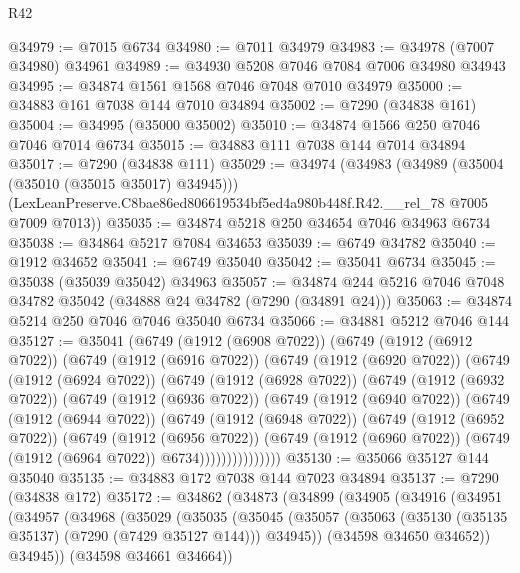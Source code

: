 \begin{lexlean}{R42}
\begin{coremodule}
{@34979 := @7015 @6734
@34980 := @7011 @34979
@34983 := @34978 (@7007 @34980) @34961
@34989 := @34930 @5208 @7046 @7084 @7006 @34980 @34943
@34995 := @34874 @1561 @1568 @7046 @7048 @7010 @34979
@35000 := @34883 @161 @7038 @144 @7010 @34894
@35002 := @7290 (@34838 @161)
@35004 := @34995 (@35000 @35002)
@35010 := @34874 @1566 @250 @7046 @7046 @7014 @6734
@35015 := @34883 @111 @7038 @144 @7014 @34894
@35017 := @7290 (@34838 @111)
@35029 := @34974
    (@34983
      (@34989 (@35004 (@35010 (@35015 @35017) @34945)))
      (LexLeanPreserve.C8bae86ed806619534bf5ed4a980b448f.R42.__rel_78 @7005 @7009 @7013))
@35035 := @34874 @5218 @250 @34654 @7046 @34963 @6734
@35038 := @34864 @5217 @7084 @34653
@35039 := @6749 @34782
@35040 := @1912 @34652
@35041 := @6749 @35040
@35042 := @35041 @6734
@35045 := @35038 (@35039 @35042) @34963
@35057 := @34874 @244 @5216 @7046 @7048 @34782 @35042 (@34888 @24 @34782 (@7290 (@34891 @24)))
@35063 := @34874 @5214 @250 @7046 @7046 @35040 @6734
@35066 := @34881 @5212 @7046 @144
@35127 := @35041
    (@6749
      (@1912 (@6908 @7022))
      (@6749
        (@1912 (@6912 @7022))
        (@6749
          (@1912 (@6916 @7022))
          (@6749
            (@1912 (@6920 @7022))
            (@6749
              (@1912 (@6924 @7022))
              (@6749
                (@1912 (@6928 @7022))
                (@6749
                  (@1912 (@6932 @7022))
                  (@6749
                    (@1912 (@6936 @7022))
                    (@6749
                      (@1912 (@6940 @7022))
                      (@6749
                        (@1912 (@6944 @7022))
                        (@6749
                          (@1912 (@6948 @7022))
                          (@6749
                            (@1912 (@6952 @7022))
                            (@6749
                              (@1912 (@6956 @7022))
                              (@6749
                                (@1912 (@6960 @7022))
                                (@6749 (@1912 (@6964 @7022)) @6734)))))))))))))))
@35130 := @35066 @35127 @144 @35040
@35135 := @34883 @172 @7038 @144 @7023 @34894
@35137 := @7290 (@34838 @172)
@35172 := @34862
    (@34873
      (@34899
        (@34905
          (@34916
            (@34951
              (@34957
                (@34968
                  (@35029
                    (@35035
                      (@35045
                        (@35057
                          (@35063 (@35130 (@35135 @35137) (@7290 (@7429 @35127 @144))) @34945))
                        (@34598 @34650 @34652))
                      @34945))
                  (@34598 @34661 @34664))
}
\end{coremodule}
\end{lexlean}
